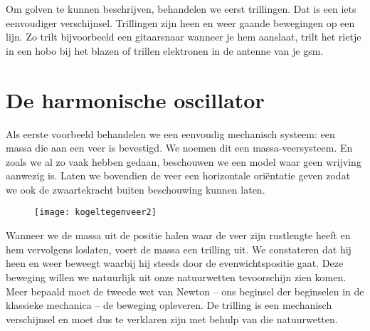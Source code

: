 \documentclass{ximera}
\begin{document}
	\author{Bart Lambregs}
    \xmsource



	Om golven te kunnen beschrijven, behandelen we eerst trillingen. Dat is een iets eenvoudiger verschijnsel. Trillingen zijn heen en weer gaande bewegingen op een lijn. Zo trilt bijvoorbeeld een gitaarsnaar wanneer je hem aanslaat, trilt het rietje in een hobo bij het blazen of trillen elektronen in de antenne van je gsm.
	

	

	
	
	\section{De harmonische oscillator}
	
	Als eerste voorbeeld behandelen we een eenvoudig mechanisch systeem: een massa die aan een veer is bevestigd. We noemen dit een massa-veersysteem. En zoals we al zo vaak hebben gedaan, beschouwen we een model waar geen wrijving aanwezig is. Laten we bovendien de veer een horizontale ori\"entatie geven zodat we ook de zwaartekracht buiten beschouwing kunnen laten.
	\begin{figure}[h]
	\centering
	\texttt{[image: kogeltegenveer2]}
	\end{figure}
	Wanneer we de massa uit de positie halen waar de veer zijn rustlengte heeft en hem vervolgens loslaten, voert de massa een trilling uit. We constateren dat hij heen en weer beweegt waarbij hij steeds door de evenwichtspositie gaat. Deze beweging willen we natuurlijk uit onze natuurwetten tevoorschijn zien komen. Meer bepaald moet de tweede wet van Newton -- ons beginsel der beginselen in de klassieke mechanica -- de beweging opleveren. De trilling is een mechanisch verschijnsel en moet dus te verklaren zijn met behulp van die natuurwetten. 
	
\end{document}
